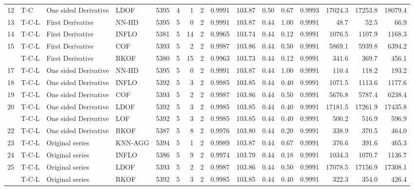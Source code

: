 \documentclass[draft]{agujournal2018} %
\begin{document}
\begin{table}[!htbp]
{\begin{tabular}{rlllrrrrrrrrrrrr}
12 & T-C & One sided Derivative & LDOF & 5395 & 4 & 1 & 2 & 0.9991 & 103.87 & 0.50 & 0.67 & 0.9993 & 17024.3 & 17253.8 & 18079.4\\
13 & T-C-L & First Derivative &  \color{black} NN-HD \color{black}  & 5395 & 5 & 0 & 2 & 0.9991 & 103.87 & 0.44 & 1.00 & 0.9991 & 48.7 & 52.5 & 66.9\\
14 & T-C-L & First Derivative & INFLO & 5381 & 5 & 14 & 2 & 0.9965 & 103.74 & 0.44 & 0.12 & 0.9991 & 1076.5 & 1107.9 & 1168.3\\
15 & T-C-L & First Derivative & COF & 5393 & 5 & 2 & 2 & 0.9987 & 103.86 & 0.44 & 0.50 & 0.9991 & 5869.1 & 5939.8 & 6394.2\\
\addlinespace
16 & T-C-L & First Derivative & RKOF & 5380 & 5 & 15 & 2 & 0.9963 & 103.73 & 0.44 & 0.12 & 0.9991 & 341.6 & 369.7 & 456.1\\
17 & T-C-L & One sided Derivative &  \color{black} NN-HD \color{black}  & 5395 & 5 & 0 & 2 & 0.9991 & 103.87 & 0.44 & 1.00 & 0.9991 & 110.4 & 118.2 & 193.2\\
18 & T-C-L & One sided Derivative & INFLO & 5392 & 5 & 3 & 2 & 0.9985 & 103.85 & 0.44 & 0.40 & 0.9991 & 1071.5 & 1113.6 & 1177.6\\
19 & T-C-L & One sided Derivative & COF & 5393 & 5 & 2 & 2 & 0.9987 & 103.86 & 0.44 & 0.50 & 0.9991 & 5676.8 & 5787.4 & 6238.4\\
20 & T-C-L & One sided Derivative & LDOF & 5392 & 5 & 3 & 2 & 0.9985 & 103.85 & 0.44 & 0.40 & 0.9991 & 17181.5 & 17261.9 & 17435.8\\
\addlinespace
21 & T-C-L & One sided Derivative & LOF & 5392 & 5 & 3 & 2 & 0.9985 & 103.85 & 0.44 & 0.40 & 0.9991 & 500.2 & 516.9 & 596.9\\
22 & T-C-L & One sided Derivative & RKOF & 5387 & 5 & 8 & 2 & 0.9976 & 103.80 & 0.44 & 0.20 & 0.9991 & 338.9 & 370.5 & 464.0\\
23 & T-C-L & Original series & KNN-AGG & 5394 & 5 & 1 & 2 & 0.9989 & 103.87 & 0.44 & 0.67 & 0.9991 & 376.6 & 391.6 & 465.3\\
24 & T-C-L & Original series & INFLO & 5386 & 5 & 9 & 2 & 0.9974 & 103.79 & 0.44 & 0.18 & 0.9991 & 1034.3 & 1070.7 & 1136.7\\
25 & T-C-L & Original series & LDOF & 5393 & 5 & 2 & 2 & 0.9987 & 103.86 & 0.44 & 0.50 & 0.9991 & 17078.5 & 17156.9 & 17308.1\\
\addlinespace
26 & T-C-L & Original series & RKOF & 5392 & 5 & 3 & 2 & 0.9985 & 103.85 & 0.44 & 0.40 & 0.9991 & 322.3 & 354.0 & 426.4\\

\end{tabular}}
\end{table}
\end{document}
